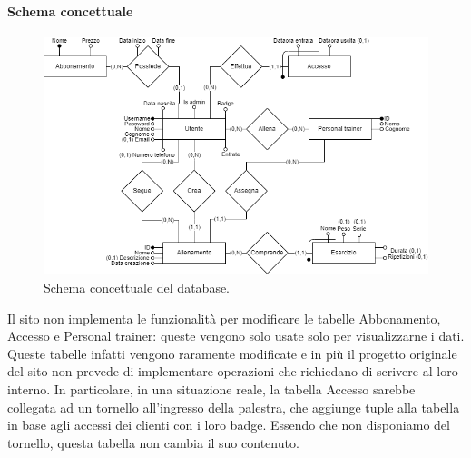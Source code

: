 \documentclass[a4paper]{article}
\begin{document}
	\paragraph{Schema concettuale}
	\begin{figure}[H]
		\centering
		\includegraphics[scale=0.6]{immagini/schemaER.png}
		\caption{Schema concettuale del database.}
	\end{figure}

	Il sito non implementa le funzionalità per modificare le tabelle Abbonamento, Accesso e Personal trainer: queste vengono solo usate solo per visualizzarne i dati. Queste tabelle infatti vengono raramente modificate e in più il progetto originale del sito non prevede di implementare operazioni che richiedano di scrivere al loro interno. In particolare, in una situazione reale, la tabella Accesso sarebbe collegata ad un tornello all'ingresso della palestra, che aggiunge tuple alla tabella in base agli accessi dei clienti con i loro badge. Essendo che non disponiamo del tornello, questa tabella non cambia il suo contenuto.
\end{document}
